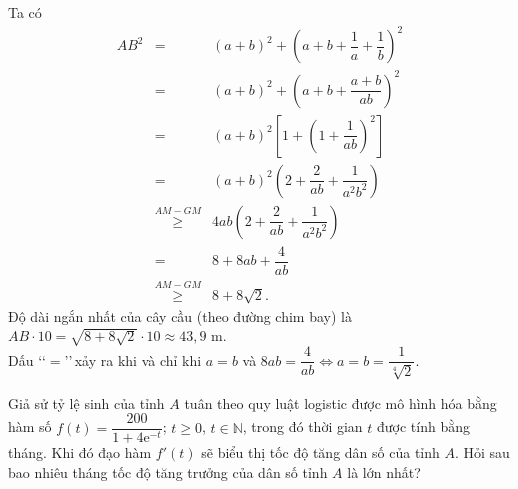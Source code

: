 \begin{bt}
{		Ta  có
		\allowdisplaybreaks 
		\begin{eqnarray*}
			AB^2&=&(a+b)^2+\left(a+b+\dfrac{1}{a}+\dfrac{1}{b}\right)^2\\ 
			 &=&(a+b)^2+\left(a+b+\dfrac{a+b}{ab}\right)^2\\
			 &=&(a+b)^2\left[1+\left(1+\dfrac{1}{ab}\right)^2\right]\\
			&=&(a+b)^2\left(2+\dfrac{2}{ab}+\dfrac{1}{a^2  b^2}\right)\\ &\stackrel{A M-G M}{\ge}& 4 a b\left(2+\dfrac{2}{ab}+\dfrac{1}{a^2 b^2}\right)\\
			 &=&8+8 a b+\dfrac{4}{ab}\\
			 &\stackrel{A M-G M}{\ge}& 8+8 \sqrt{2}.
		\end{eqnarray*}
		Độ dài ngắn  nhất của cây cầu (theo đường chim bay) là $AB\cdot 10=\sqrt{8+8\sqrt{2}}\cdot 10\approx 43{,}9$ m.\\
		 Dấu \lq\lq$=$\rq\rq\,xảy ra khi và chỉ khi $a=b$ và $8a b=\dfrac{4}{ab}\Leftrightarrow a=b=\dfrac{1}{\sqrt[4]{2}}$.
	} 
\end{bt}

\begin{bt}%
	Giả sử tỷ lệ sinh của tỉnh $A$ tuân theo quy luật logistic được mô hình hóa bằng hàm số $f(t)=\dfrac{200}{1+4\mathrm{e}^{-t}}$; $t \geq 0$, $t \in \mathbb{N}$, trong đó thời gian $t$ được tính bằng tháng. Khi đó đạo hàm $f'(t)$ sẽ biểu thị tốc độ tăng dân số của tỉnh $A$. Hỏi sau bao nhiêu tháng tốc độ tăng trưởng của  dân số tỉnh $A$ là lớn nhất?
\end{bt}


